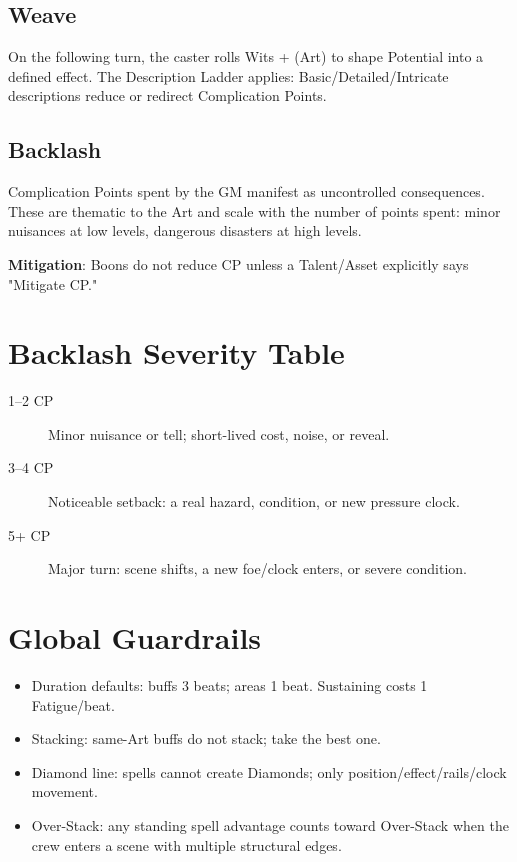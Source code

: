 \subsection{Weave}
On the following turn, the caster rolls Wits + (Art) to shape Potential into a defined effect. The Description Ladder applies: Basic/Detailed/Intricate descriptions reduce or redirect Complication Points.

\subsection{Backlash}
Complication Points spent by the GM manifest as uncontrolled consequences. These are thematic to the Art and scale with the number of points spent: minor nuisances at low levels, dangerous disasters at high levels.

\textbf{Mitigation}: Boons do not reduce CP unless a Talent/Asset explicitly says "Mitigate CP."

\section{Backlash Severity Table}

\begin{description}
\item[1--2 CP] Minor nuisance or tell; short-lived cost, noise, or reveal.
\item[3--4 CP] Noticeable setback: a real hazard, condition, or new pressure clock.
\item[5+ CP] Major turn: scene shifts, a new foe/clock enters, or severe condition.
\end{description}

\section{Global Guardrails}

\begin{itemize}
\item Duration defaults: buffs 3 beats; areas 1 beat. Sustaining costs 1 Fatigue/beat.
\item Stacking: same-Art buffs do not stack; take the best one.
\item Diamond line: spells cannot create Diamonds; only position/effect/rails/clock movement.
\item Over-Stack: any standing spell advantage counts toward Over-Stack when the crew enters a scene with multiple structural edges.
\end{itemize}


